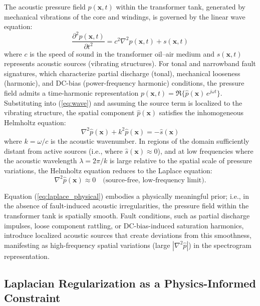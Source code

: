 \documentclass[twocolumn,iicol,pdflatex,sn-mathphys-num]{sn-jnl}%
\begin{document}
The acoustic pressure field $p(\mathbf{x}, t)$ within the transformer tank, generated by mechanical vibrations of the core and windings, is governed by the linear wave equation:
\begin{equation}
	\frac{\partial^2 p(\mathbf{x}, t)}{\partial t^2} = c^2 \nabla^2 p(\mathbf{x}, t) + s(\mathbf{x}, t)
	\label{eq:wave}
\end{equation}
\noindent where $c$ is the speed of sound in the transformer oil--air medium and $s(\mathbf{x}, t)$ represents acoustic sources (vibrating structures). For tonal and narrowband fault signatures, which characterize partial discharge (tonal), mechanical looseness (harmonic), and DC-bias (power-frequency harmonic) conditions, the pressure field admits a time-harmonic representation $p(\mathbf{x}, t) = \Re\{\hat{p}(\mathbf{x})\, e^{j\omega t}\}$. Substituting into (\ref{eq:wave}) and assuming the source term is localized to the vibrating structure, the spatial component $\hat{p}(\mathbf{x})$ satisfies the inhomogeneous Helmholtz equation:
\begin{equation}
	\nabla^2 \hat{p}(\mathbf{x}) + k^2 \hat{p}(\mathbf{x}) = -\hat{s}(\mathbf{x})
	\label{eq:helmholtz}
\end{equation}
\noindent where $k = \omega / c$ is the acoustic wavenumber. In regions of the domain sufficiently distant from active sources (i.e., where $\hat{s}(\mathbf{x}) \approx 0$), and at low frequencies where the acoustic wavelength $\lambda = 2\pi/k$ is large relative to the spatial scale of pressure variations, the Helmholtz equation reduces to the Laplace equation:
\begin{equation}
	\nabla^2 \hat{p}(\mathbf{x}) \approx 0 \quad \text{(source-free, low-frequency limit)}.
	\label{eq:laplace_physical}
\end{equation}

Equation (\ref{eq:laplace_physical}) embodies a physically meaningful prior; i.e., in the absence of fault-induced acoustic irregularities, the pressure field within the transformer tank is spatially smooth. Fault conditions, such as partial discharge impulses, loose component rattling, or DC-bias-induced saturation harmonics, introduce localized acoustic sources that create deviations from this smoothness, manifesting as high-frequency spatial variations (large $|\nabla^2 \hat{p}|$) in the spectrogram representation.

\subsection{Laplacian Regularization as a Physics-Informed Constraint}
\end{document}

